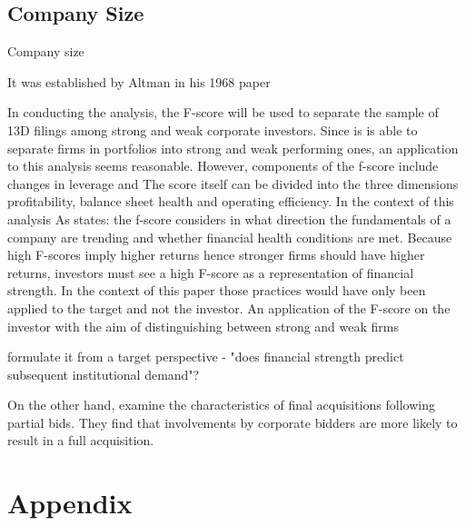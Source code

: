 \documentclass[12pt]{article}
\begin{document}
\subsection{Company Size}
Company size 



\pagebreak

It was established by Altman in his 1968 paper 


In conducting the analysis, the F-score will be used to separate  the sample of 13D filings among strong and weak corporate investors. Since is is able to separate firms in portfolios into strong and weak performing ones, an application to this analysis seems reasonable. 
However, components of the f-score include changes in leverage and The score itself can be divided into the three dimensions profitability, balance sheet health and operating efficiency. 
In the context of this analysis As \citet{Mohr2012} states: the f-score considers in what direction the fundamentals of a company are trending and whether financial health conditions are met.  Because high F-scores imply higher returns hence stronger firms should have higher returns, investors must see a high F-score as a representation of financial strength. In the context of this paper those practices would have only been applied to the target and not the investor. An application of the F-score on the investor with the aim of distinguishing between strong and weak firms 


\citet{Choi2012} formulate it from a target perspective - "does financial strength predict subsequent institutional demand"? 


On the other hand, \citet{Akhigbe2007} examine the characteristics of final acquisitions following partial bids. They find that involvements by corporate bidders are more likely to result in a full acquisition. 


\section{Appendix}
\end{document}
